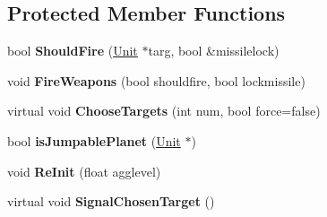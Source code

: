 \subsection*{Protected Member Functions}
\begin{DoxyCompactItemize}
\item 
bool {\bfseries Should\+Fire} (\hyperlink{classUnit}{Unit} $\ast$targ, bool \&missilelock)\hypertarget{classOrders_1_1FireAt_aa7cf8b89c06620ca5b9493d2b6093c4c}{}\label{classOrders_1_1FireAt_aa7cf8b89c06620ca5b9493d2b6093c4c}

\item 
void {\bfseries Fire\+Weapons} (bool shouldfire, bool lockmissile)\hypertarget{classOrders_1_1FireAt_ae462ad59e39c2c648bd7906086e1ac3b}{}\label{classOrders_1_1FireAt_ae462ad59e39c2c648bd7906086e1ac3b}

\item 
virtual void {\bfseries Choose\+Targets} (int num, bool force=false)\hypertarget{classOrders_1_1FireAt_a99e5c740d50ece858025975b0c700ea2}{}\label{classOrders_1_1FireAt_a99e5c740d50ece858025975b0c700ea2}

\item 
bool {\bfseries is\+Jumpable\+Planet} (\hyperlink{classUnit}{Unit} $\ast$)\hypertarget{classOrders_1_1FireAt_a41a2cd20916c9ab5e4c6b1becf6626aa}{}\label{classOrders_1_1FireAt_a41a2cd20916c9ab5e4c6b1becf6626aa}

\item 
void {\bfseries Re\+Init} (float agglevel)\hypertarget{classOrders_1_1FireAt_a1cd79614e2188572630072838b52efbd}{}\label{classOrders_1_1FireAt_a1cd79614e2188572630072838b52efbd}

\item 
virtual void {\bfseries Signal\+Chosen\+Target} ()\hypertarget{classOrders_1_1FireAt_a31e70675ce0bb46bd5889d41761cfbcc}{}\label{classOrders_1_1FireAt_a31e70675ce0bb46bd5889d41761cfbcc}

\end{DoxyCompactItemize}
